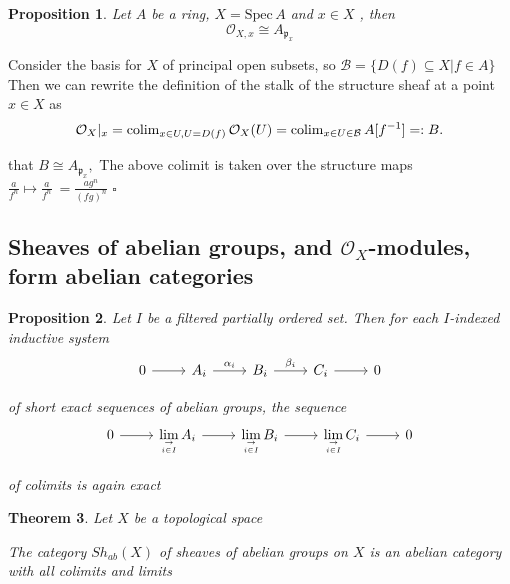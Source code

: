 \documentclass{article}
\newtheorem{theorem}{Theorem}[section]
\newtheorem{proposition}[theorem]{Proposition}
\newenvironment{Proof}{{\noindent \indent \it Proof:\quad}}{\hfill $\square$\par}
\begin{document}
\begin{proposition}
    Let $A$ be a ring, $X={\mathrm{Spec}}\,A$ and $x\in X$ , then
$$
{\mathcal{O}}_{X,x}\cong A_{\mathfrak{p}_x} 
$$
\end{proposition}
\begin{Proof}
Consider the basis for $X$ of principal open subsets, so $\mathcal B=\{D(f)\subseteq X|f\in A\}$ Then we can rewrite the definition of the stalk of the structure sheaf at a point $x\in X$ as
$$
{\cal O}_{X}|_{x}=\mathrm{colim}_{x\in{ U},{ U}={ D}(f)}\,{\cal O}_{X}(U)=\mathrm{colim}_{x\in{U}\in{\cal B}}\,A[f^{-1}]=:B. 
$$

that $B\cong A_{\mathfrak{p}_x},$ The above colimit is taken over the structure maps ${\frac{a}{f^{n}}}\longmapsto{\frac{a}{f^{n}}}\ ={\frac{a g^{n}}{(f g)^{n}}}$
\end{Proof}




\newpage
\subsection{Sheaves of abelian groups, and $\mathscr O_X$-modules, form abelian categories}
\begin{proposition}
    Let $I$ be a filtered partially ordered set. Then for each $I$-indexed inductive system
\[\begin{tikzcd}
	0 & {A_i} & {B_i} & {C_i} & 0
	\arrow[from=1-1, to=1-2]
	\arrow["{\alpha_i}", from=1-2, to=1-3]
	\arrow["{\beta_i}", from=1-3, to=1-4]
	\arrow[from=1-4, to=1-5]
\end{tikzcd}\]

of short exact sequences of abelian groups, the sequence
\[\begin{tikzcd}
	0 & {\lim\limits_{\rightarrow\atop {i\in I}} A_i} & {\lim\limits_{\rightarrow\atop {i\in I}} B_i} & {\lim\limits_{\rightarrow\atop {i\in I}} C_i} & 0
	\arrow[from=1-1, to=1-2]
	\arrow[from=1-2, to=1-3]
	\arrow[from=1-3, to=1-4]
	\arrow[from=1-4, to=1-5]
\end{tikzcd}\]

of colimits is again exact
\end{proposition}

\begin{theorem}
Let $X$ be a topological space

The category $Sh_{ab}(X)$ of sheaves of abelian groups on $X$ is an abelian category with
all colimits and limits
\end{theorem}
\end{document}
